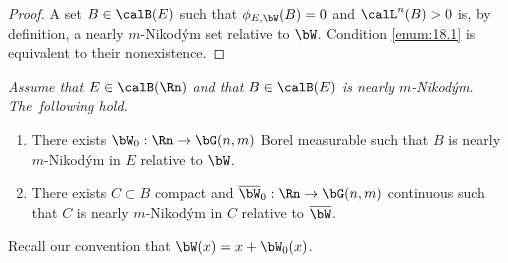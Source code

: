 \begin{proof}
A set $B \in \calB(E)$ such that $\phi_{E,\bW}(B)=0$ and $\calL^n(B) > 0$ is, by definition, a nearly $m$-Nikod\'ym set relative to $\bW$.
Condition \eqref{enum:18.1} is equivalent to their nonexistence.
\end{proof}

\begin{Empty}[]
\label{nik.set}
{\it
Assume that $E \in \calB(\Rn)$ and that $B \in \calB(E)$ is nearly $m$-Nikod\'ym. The~fol\-lowing hold.
\begin{enumerate}
\item\label{enum:19.1} There exists $\bW_0: \Rn \to \bG(n,m)$ Borel measurable such that $B$ is nearly $m$\nobreakdash-Nikod\'ym in $E$ relative to $\bW$.
\item\label{enum:19.2} There exists $C \subset B$ compact and $\overline{\bW}_0: \Rn \to \bG(n,m)$ continuous such that $C$ is nearly $m$-Nikod\'ym in $C$ relative to $\overline{\bW}$.
\end{enumerate}
Recall our convention that $\bW(x) = x + \bW_0(x)$.
}
\end{Empty}

